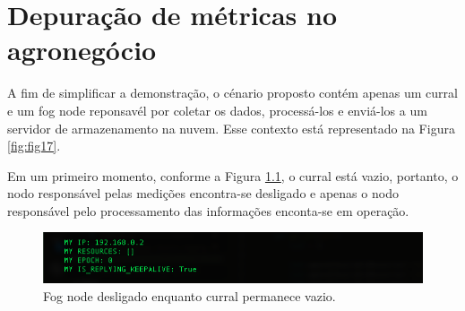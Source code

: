 \documentclass[portuguese,oneside]{tcc}
\begin{document}
  
  
  
  
  \anexos
  \chapter{Depuração de métricas no agronegócio}
  
A fim de simplificar a demonstração, o cénario proposto contém apenas um curral e um fog node reponsavél por coletar os dados, processá-los e enviá-los a um servidor de armazenamento na nuvem.
Esse contexto está representado na Figura \ref{fig:fig17}.

Em um primeiro momento, conforme a Figura \ref{fig:fig18}, o curral está vazio, portanto, o nodo responsável pelas medições encontra-se desligado e apenas o nodo responsável 
pelo processamento das informações enconta-se em operação.

\begin{figure}[H]
  \centering\includegraphics[width=.9\textwidth]{fig18.png}
  \caption [Fog node desligado enquanto curral permanece vazio]
  {\label{fig:fig18} Fog node desligado enquanto curral permanece vazio.}
\end{figure}
\end{document}
